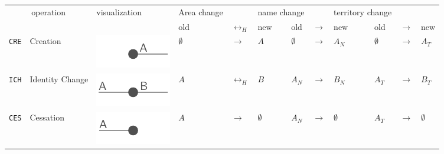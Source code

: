 \begin{table}[!h]
\begin{center}
\begin{tabular}{m{0.65cm} m{2.5cm} m{2.2cm}
                m{0.35cm} m{0.35cm} m{0.35cm} m{0.01cm}
                m{0.35cm} m{0.3cm} m{0.35cm} m{0.01cm}
                m{0.35cm} m{0.3cm} m{0.88cm}}
  \toprule
    \multicolumn{2}{c}{operation}
  & visualization
  & \multicolumn{e3}{c}{Area change} &
  & \multicolumn{3}{c}{name change} &
  & \multicolumn{3}{c}{territory change} \\
  & & &
  old & $ \leftrightarrow_H $ & new & &
  old & $ \rightarrow $ & new & &
  old & $ \rightarrow $ & new \\

  \midrule[0.07em]
  \texttt{CRE} & Creation & \includegraphics{graphics/concept/operations/CRE} &
  $ \emptyset $ & $ \rightarrow $ & $ A $ & &
  $ \emptyset $ & $ \rightarrow $ & $ A_N $ & &
  $ \emptyset $ & $ \rightarrow $ & $ A_T $ \\

  \midrule[0.01em]
  \texttt{ICH} & Identity Change & \includegraphics{graphics/concept/operations/ICH} &
  $ A   $ & $ \leftrightarrow_H $ & $ B $ & &
  $ A_N $ & $ \rightarrow $       & $ B_N $ & &
  $ A_T $ & $ \rightarrow $       & $ B_T $ \\

  \midrule[0.01em]
  \texttt{CES} & Cessation & \includegraphics{graphics/concept/operations/CES} &
  $ A $   & $ \rightarrow $       & $ \emptyset $ & &
  $ A_N $ & $ \rightarrow $       & $ \emptyset $ & &
  $ A_T $ & $ \rightarrow $       & $ \emptyset $ \\


\end{tabular}
\end{center}
\end{table}
